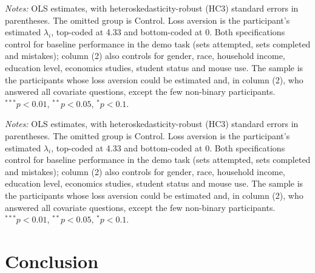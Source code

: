 \documentclass[12pt, letterpaper]{article}
\begin{document}
\begin{table}
\centering
\begin{threeparttable}

\begin{tablenotes}[flushleft]
\footnotesize
\item \textit{Notes:} OLS estimates, with heteroskedasticity-robust (HC3) standard errors in parentheses. The omitted group is Control. Loss aversion is the participant's estimated $\lambda_i$, top-coded at 4.33 and bottom-coded at 0. Both specifications control for baseline performance in the demo task (sets attempted, sets completed and mistakes); column (2) also controls for gender, race, household income, education level, economics studies, student status and mouse use. The sample is the participants whose loss aversion could be estimated and, in column (2), who answered all covariate questions, except the few non-binary participants. $^{***}p<0.01$, $^{**}p<0.05$, $^{*}p<0.1$.
\end{tablenotes}
\end{threeparttable}
\caption{Treatment effects on mistake rate interacted with loss aversion}\label{tab:reg-mistakes-la}
\end{table}

\begin{table}
\centering
\begin{threeparttable}

\begin{tablenotes}[flushleft]
\footnotesize
\item \textit{Notes:} OLS estimates, with heteroskedasticity-robust (HC3) standard errors in parentheses. The omitted group is Control. Loss aversion is the participant's estimated $\lambda_i$, top-coded at 4.33 and bottom-coded at 0. Both specifications control for baseline performance in the demo task (sets attempted, sets completed and mistakes); column (2) also controls for gender, race, household income, education level, economics studies, student status and mouse use. The sample is the participants whose loss aversion could be estimated and, in column (2), who answered all covariate questions, except the few non-binary participants. $^{***}p<0.01$, $^{**}p<0.05$, $^{*}p<0.1$.
\end{tablenotes}
\end{threeparttable}
\caption{Treatment effects on sets completed interacted with loss aversion}\label{tab:reg-sets-la}
\end{table}

\section{Conclusion}
\end{document}
